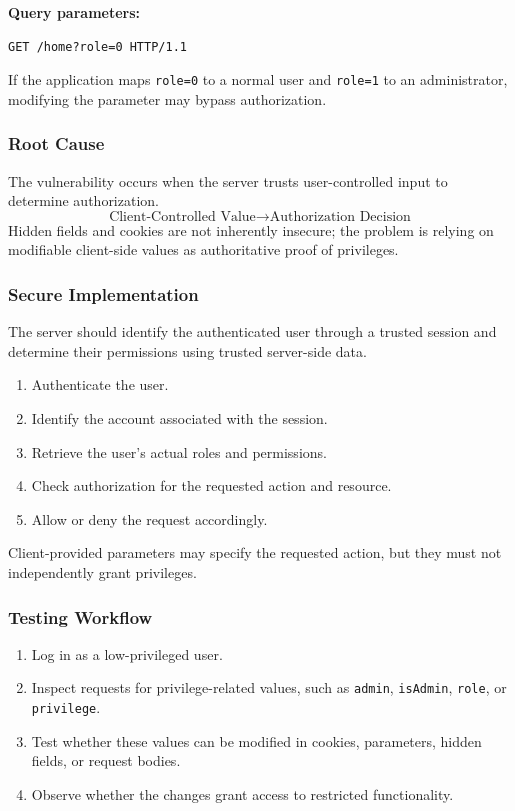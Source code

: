 \documentclass[11pt,a4paper]{article}
\begin{document}
\textbf{Query parameters:}
\begin{lstlisting}[language=HTTP]
GET /home?role=0 HTTP/1.1
\end{lstlisting}

If the application maps \texttt{role=0} to a normal user and \texttt{role=1} to an administrator, modifying the parameter may bypass authorization.

\subsubsection{Root Cause}

The vulnerability occurs when the server trusts user-controlled input to determine authorization.
\[
    \text{Client-Controlled Value}
    \rightarrow
    \text{Authorization Decision}
\]
Hidden fields and cookies are not inherently insecure; the problem is relying on modifiable client-side values as authoritative proof of privileges.

\subsubsection{Secure Implementation}

The server should identify the authenticated user through a trusted session and determine their permissions using trusted server-side data.

\begin{enumerate}
    \item Authenticate the user.
    \item Identify the account associated with the session.
    \item Retrieve the user's actual roles and permissions.
    \item Check authorization for the requested action and resource.
    \item Allow or deny the request accordingly.
\end{enumerate}

Client-provided parameters may specify the requested action, but they must not independently grant privileges.

\subsubsection{Testing Workflow}

\begin{enumerate}
    \item Log in as a low-privileged user.
    \item Inspect requests for privilege-related values, such as \texttt{admin}, \texttt{isAdmin}, \texttt{role}, or \texttt{privilege}.
    \item Test whether these values can be modified in cookies, parameters, hidden fields, or request bodies.
    \item Observe whether the changes grant access to restricted functionality.
\end{enumerate}
\end{document}

